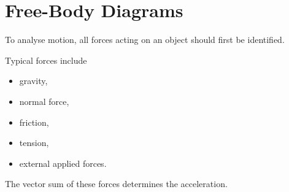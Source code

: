 \section{Free-Body Diagrams}

To analyse motion, all forces acting on an object should first be identified.

Typical forces include

\begin{itemize}
	\item gravity,
	\item normal force,
	\item friction,
	\item tension,
	\item external applied forces.
\end{itemize}

The vector sum of these forces determines the acceleration.

